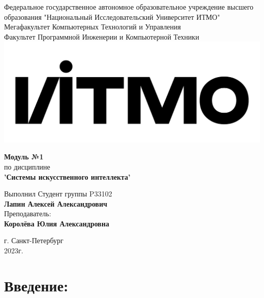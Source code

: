 \documentclass[12pt,onecolumn]{article}
\begin{document}
\setcounter{tocdepth}{4}
\begin{center}
    Федеральное государственное автономное образовательное учреждение высшего образования "Национальный Исследовательский Университет ИТМО"\\ 
    Мегафакультет Компьютерных Технологий и Управления\\
    Факультет Программной Инженерии и Компьютерной Техники \\
    \includegraphics[scale=0.3]{image/itmo.jpg} %
\end{center}
\vspace{1cm}


\begin{center}
    \textbf{Модуль №1}\\
    по дисциплине\\
    \textbf{'Системы искусственного интеллекта'}
\end{center}

\vspace{2cm}

\begin{flushright}
  Выполнил Студент  группы P33102\\
  \textbf{Лапин Алексей Александрович}\\
  Преподаватель: \\
  \textbf{Королёва Юлия Александровна}\\
\end{flushright}

\vspace{6cm}
\begin{center}
    г. Санкт-Петербург\\
    2023г.
\end{center}

\newpage
\tableofcontents
\newpage

\section{Введение:}
\end{document}
